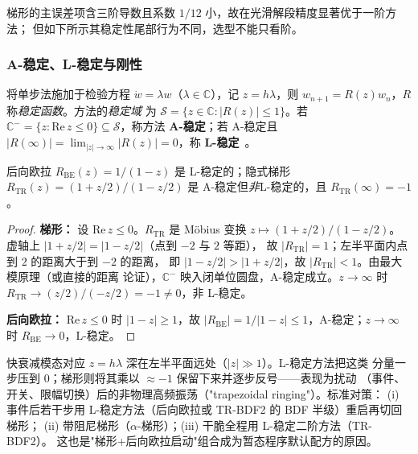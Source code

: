 梯形的主误差项含三阶导数且系数 $1/12$ 小，故在光滑解段精度显著优于一阶方法；
但如下所示其稳定性尾部行为不同，选型不能只看阶。

\subsubsection{A-稳定、L-稳定与刚性}

\begin{definition}[稳定函数与 A-稳定/L-稳定]\label{def:dy-th-mac-stability}
将单步法施加于检验方程 $\dot w=\lambda w$（$\lambda\in\mathbb C$），记
$z=h\lambda$，则 $w_{n+1}=R(z)w_n$，$R$ 称\emph{稳定函数}。方法的\emph{稳定域}
为 $\mathcal S=\{z\in\mathbb C:|R(z)|\le1\}$。若 $\mathbb C^-=\{z:\mathrm{Re}\,z\le0\}
\subseteq\mathcal S$，称方法 \textbf{A-稳定}；若 A-稳定且 $|R(\infty)|=
\lim_{|z|\to\infty}|R(z)|=0$，称 \textbf{L-稳定}~\cite{dym:hairer2}。
\end{definition}

\begin{theorem}[后向欧拉与隐式梯形的稳定性]\label{thm:dy-th-mac-astab}
后向欧拉 $R_{\mathrm{BE}}(z)=1/(1-z)$ 是 L-稳定的；隐式梯形
$R_{\mathrm{TR}}(z)=(1+z/2)/(1-z/2)$ 是 A-稳定但\emph{非}L-稳定的，且
$R_{\mathrm{TR}}(\infty)=-1$。
\end{theorem}

\begin{proof}
\textbf{梯形：} 设 $\mathrm{Re}\,z\le0$。$R_{\mathrm{TR}}$ 是 Möbius 变换
$z\mapsto(1+z/2)/(1-z/2)$。虚轴上 $|1+z/2|=|1-z/2|$（点到 $-2$ 与 $2$ 等距），
故 $|R_{\mathrm{TR}}|=1$；左半平面内点到 $2$ 的距离大于到 $-2$ 的距离，
即 $|1-z/2|>|1+z/2|$，故 $|R_{\mathrm{TR}}|<1$。由最大模原理（或直接的距离
论证），$\mathbb C^-$ 映入闭单位圆盘，A-稳定成立。$z\to\infty$ 时
$R_{\mathrm{TR}}\to( z/2)/(-z/2)=-1\ne0$，非 L-稳定。

\textbf{后向欧拉：} $\mathrm{Re}\,z\le0$ 时 $|1-z|\ge1$，故
$|R_{\mathrm{BE}}|=1/|1-z|\le1$，A-稳定；$z\to\infty$ 时
$R_{\mathrm{BE}}\to0$，L-稳定。
\end{proof}

\begin{remark}[$R(\infty)=-1$ 的工程含义：梯形振铃]\label{rem:dy-th-mac-ringing}
快衰减模态对应 $z=h\lambda$ 深在左半平面远处（$|z|\gg1$）。L-稳定方法把这类
分量一步压到 $0$；梯形则将其乘以 $\approx-1$ 保留下来并逐步反号——表现为扰动
（事件、开关、限幅切换）后的非物理高频振荡（"trapezoidal ringing"）。标准对策：
(i) 事件后若干步用 L-稳定方法（后向欧拉或 TR-BDF2 的 BDF 半级）重启再切回梯形；
(ii) 带阻尼梯形（$\alpha$-梯形）；(iii) 干脆全程用 L-稳定二阶方法（TR-BDF2）。
这也是"梯形+后向欧拉启动"组合成为暂态程序默认配方的原因。
\end{remark}

